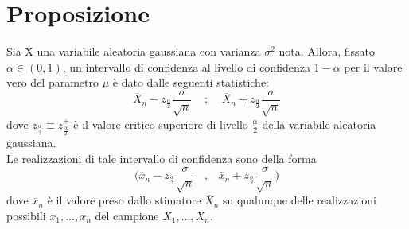 \documentclass{article}
\begin{document}
\section*{Proposizione}
Sia X una variabile aleatoria gaussiana con varianza $\sigma^{2}$ nota. Allora, fissato $\alpha \in (0,1)$, un intervallo di confidenza al livello di confidenza $1-\alpha$ per il valore vero del parametro $\mu$ è dato dalle seguenti statistiche:
\[ \overline{X}_{n} - z_{\frac{\alpha}{2}}\frac{\sigma}{\sqrt{n}} \; \; \; \; ; \; \; \; \; \overline{X}_{n} + z_{\frac{\alpha}{2}}\frac{\sigma}{\sqrt{n}} \]
dove $z_{\frac{\alpha}{2}} \equiv  z_{\frac{\alpha}{2}}^{+}$ è il valore critico superiore di livello $\frac{\alpha}{2}$ della variabile aleatoria gaussiana.\\
Le realizzazioni di tale intervallo di confidenza sono della forma
\[ \Big( \overline{x}_{n} - z_{\frac{\alpha}{2}}\frac{\sigma}{\sqrt{n}} \; \; \; , \; \; \; \overline{x}_{n} + z_{\frac{\alpha}{2}}\frac{\sigma}{\sqrt{n}} \Big) \]
dove $\overline{x}_{n}$ è il valore preso dallo stimatore $\overline{X}_{n}$ su qualunque delle realizzazioni possibili $x_{1},...,x_{n}$ del campione $X_{1},...,X_{n}$.
\end{document}
